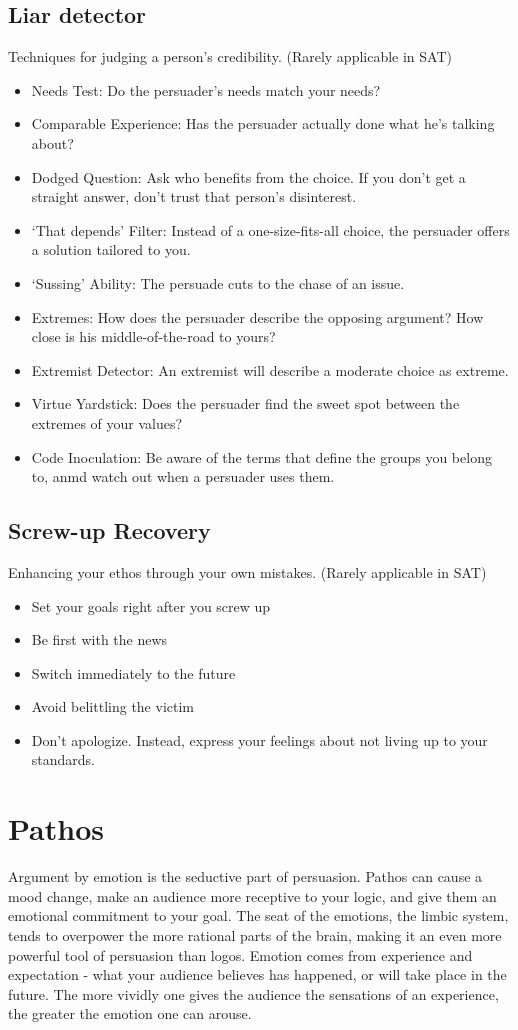 \subsection{Liar detector}
Techniques for judging a person's credibility. (Rarely applicable in SAT)
\begin{itemize}
	\item Needs Test: Do the persuader's needs match your needs?
	\item Comparable Experience: Has the persuader actually done what he's talking about?
	\item Dodged Question: Ask who benefits from the choice. If you don't get a straight answer, don't trust that person's disinterest.
	\item `That depends' Filter: Instead of a one-size-fits-all choice, the persuader offers a solution tailored to you.
	\item `Sussing' Ability: The persuade cuts to the chase of an issue.
	\item Extremes: How does the persuader describe the opposing argument? How close is his middle-of-the-road to yours?
	\item Extremist Detector: An extremist will describe a moderate choice as extreme.
	\item Virtue Yardstick: Does the persuader find the sweet spot between the extremes of your values?
	\item Code Inoculation: Be aware of the terms that define the groups you belong to, anmd watch out when a persuader uses them.
\end{itemize}

\subsection{Screw-up Recovery}
Enhancing your ethos through your own mistakes. (Rarely applicable in SAT)
\begin{itemize}
	\item Set your goals right after you screw up
	\item Be first with the news
	\item Switch immediately to the future
	\item Avoid belittling the victim
	\item Don't apologize. Instead, express your feelings about not living up to your standards.
\end{itemize}

\section{Pathos}
Argument by emotion is the seductive part of persuasion. Pathos can cause a mood change, make an audience more receptive to your logic, and give them an emotional commitment to your goal. The seat of the emotions, the limbic system, tends to overpower the more rational parts of the brain, making it an even more powerful tool of persuasion than logos. Emotion comes from experience and expectation - what your audience believes has happened, or will take place in the future. The more vividly one gives the audience the sensations of an experience, the greater the emotion one can arouse.

